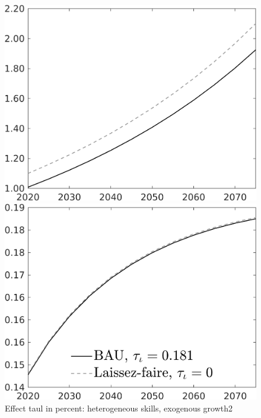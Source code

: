 \documentclass[12pt]{article}
\begin{document}
\begin{figure}[h!!]
	\centering
	\caption{Effect taul in percent: heterogeneous skills, exogenous growth2}\label{fig:LF_BAU_nsk0_xgr12}
	\begin{minipage}[]{0.32\textwidth}
		\includegraphics[width=1\textwidth]{../../codding_model/own_basedOnFried/optimalPol_010922_revision/figures/all_13Sept22/CompTaul_LFBAU_Reg0_Y_spillover0_nsk0_xgr1_knspil0_sep1_countec0_GovRev0_etaa0.79_lgd0.png}
	\end{minipage}	
	\begin{minipage}[]{0.32\textwidth}
		\includegraphics[width=1\textwidth]{../../codding_model/own_basedOnFried/optimalPol_010922_revision/figures/all_13Sept22/CompTaul_LFBAU_Reg0_GFF_spillover0_nsk0_xgr1_knspil0_sep1_countec0_GovRev0_etaa0.79_lgd1.png}

\end{minipage}
\end{figure}
\end{document}
